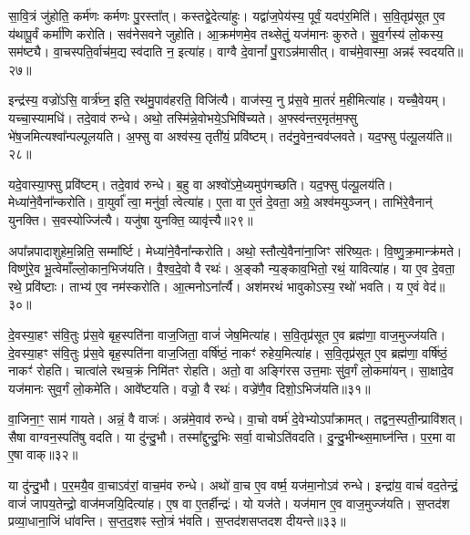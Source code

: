 सा॒वि॒त्रं जु॑होति॒ कर्म॑णः कर्मणः पु॒रस्ता᳚त्।
कस्तद्वे॒देत्या॑हुः।
यद्वा॑ज॒पेय॑स्य॒ पूर्वं॒ यदप॑र॒मिति॑।
स॒वि॒तृप्र॑सूत ए॒व य॑थापू॒र्वं कर्मा॑णि करोति।
सव॑नेसवने जुहोति।
आ॒क्रम॑णमे॒व तथ्सेतुं॒ यज॑मानः कुरुते।
सु॒व॒र्गस्य॑ लो॒कस्य॒ सम॑ष्ट्यै।
वा॒चस्पति॒र्वाच॑म॒द्य स्व॑दाति न॒ इत्या॑ह।
वाग्वै दे॒वानां᳚ पु॒रा\-ऽन्न॑मासीत्।
वाच॑मे॒वास्मा॒ अन्नꣴ॑ स्वदयति॥२७॥

इन्द्र॑स्य॒ वज्रो॑ऽसि॒ वार्त्र॑घ्न॒ इति॒ रथ॑मु॒पाव॑हरति॒ विजि॑त्यै।
वाज॑स्य॒ नु प्र॑स॒वे मा॒तरं॑ म॒हीमित्या॑ह।
यच्चै॒वेयम्।
यच्चा॒स्यामधि॑।
तदे॒वाव॑ रुन्धे।
अथो॒ तस्मि॑न्ने॒वोभये॒\-ऽभि\-षि॑च्यते।
अ॒फ्स्व॑न्तर॒मृत॑\-म॒फ्सु भे॑ष॒जमित्यश्वा᳚न्पल्पूलयति।
अ॒फ्सु वा अश्व॑स्य॒ तृती॑यं॒ प्रवि॑ष्टम्।
तद॑नु॒वेन॒न्वव॑प्लवते।
यद॒फ्सु प॑ल्पू॒लय॑ति॥२८॥

यदे॒वास्या॒फ्सु प्रवि॑ष्टम्।
तदे॒वाव॑ रुन्धे।
ब॒हु वा अश्वो॑\-ऽमे॒ध्यमुप॑\-गच्छति।
यद॒फ्सु प॑ल्पू॒लय॑ति।
मेध्या॑ने॒वै\-ना᳚न्करोति।
वा॒युर्वा᳚ त्वा॒ मनु॑र्वा॒ त्वेत्या॑ह।
ए॒ता वा ए॒तं दे॒वता॒ अग्रे॒ अश्व॑मयुञ्जन्।
ताभि॑रे॒वैनान्॑ युनक्ति।
स॒वस्योज्जि॑त्यै।
यजु॑षा युनक्ति॒ व्यावृ॑त्त्यै॥२९॥

अपा᳚न्नपादाशुहेम॒न्निति॒ सम्मा᳚र्ष्टि।
मेध्या॑ने॒वैना᳚न्करोति।
अथो॒ स्तौत्ये॒वैना॑ना॒जिꣳ स॑रिष्य॒तः।
वि॒ष्णु॒क्र॒मान्क्र॑मते।
विष्णु॑रे॒व भू॒त्वेमाँल्लो॒कान॒भिज॑यति।
वै॒श्व॒दे॒वो वै रथः॑।
अ॒ङ्कौ न्य॒ङ्काव॒भितो॒ रथं॒ यावित्या॑ह।
या ए॒व दे॒वता॒ रथे॒ प्रवि॑ष्टाः।
ताभ्य॑ ए॒व नम॑स्करोति।
आ॒त्मनो\-ऽना᳚र्त्यै।
अश॑मरथं भावुको\-ऽस्य॒ रथो॑ भवति।
य ए॒वं वेद॑॥३०॥\anuvakamend[स्व॒द॒य॒ति॒ प॒ल्पू॒लय॑ति॒ व्यावृ॑त्त्या॒ अना᳚र्त्यै॒ द्वे च॑]

दे॒वस्या॒हꣳ स॑वि॒तुः प्र॑स॒वे बृह॒स्पति॑ना वाज॒जिता॒ वाजं॑ जेष॒मित्या॑ह।
स॒वि॒तृप्र॑सूत ए॒व ब्रह्म॑णा॒ वाज॒मुज्ज॑यति।
दे॒वस्या॒हꣳ स॑वि॒तुः प्र॑स॒वे बृह॒स्पति॑ना वाज॒जिता॒ वर्\mbox{}षि॑ष्ठं॒ नाकꣳ॑ रुहेय॒मित्या॑ह।
स॒वि॒तृप्र॑सूत ए॒व ब्रह्म॑णा॒ वर्\mbox{}षि॑ष्ठं॒ नाकꣳ॑ रोहति।
चात्वा॑ले रथच॒क्रं निमि॑तꣳ रोहति।
अतो॒ वा अङ्गि॑रस उत्त॒माः सु॑व॒र्गं लो॒कमा॑यन्।
सा॒क्षादे॒व यज॑मानः सुव॒र्गं लो॒कमे॑ति।
आवे᳚ष्टयति।
वज्रो॒ वै रथः॑।
वज्रे॑णै॒व दिशो॒\-ऽभिज॑यति॥३१॥

वा॒जिना॒ꣳ॒ साम॑ गायते।
अन्नं॒ वै वाजः॑।
अन्न॑मे॒वाव॑ रुन्धे।
वा॒चो वर्ष्म॑ दे॒वेभ्यो\-ऽपा᳚क्रामत्।
तद्वन॒स्पती॒न्प्रावि॑शत्।
सैषा वाग्वन॒स्पति॑षु वदति।
या दु॑न्दु॒भौ।
तस्मा᳚द्दुन्दु॒भिः सर्वा॒ वाचो\-ऽति॑वदति।
दु॒न्दु॒भीन्थ्स॒माघ्न॑न्ति।
प॒र॒मा वा ए॒षा वाक्॥३२॥

या दु॑न्दु॒भौ।
प॒र॒मयै॒व वा॒चा\-ऽव॑रां॒ वाच॒म॑व रुन्धे।
अथो॑ वा॒च ए॒व वर्ष्म॒ यज॑मा॒नो\-ऽव॑ रुन्धे।
इन्द्रा॑य॒ वाचं॑ वद॒तेन्द्रं॒ वाजं॑ जापय॒तेन्द्रो॒ वाज॑मजयि॒दित्या॑ह।
ए॒ष वा ए॒तर्\mbox{}हीन्द्रः॑।
यो यज॑ते।
यज॑मान ए॒व वाज॒मुज्ज॑यति।
स॒प्तद॑श प्रव्या॒धाना॒जिं धा॑वन्ति।
स॒प्त॒द॒शꣴ स्तो॒त्रं भ॑वति।
स॒प्तद॑शसप्तदश दीयन्ते॥३३॥

